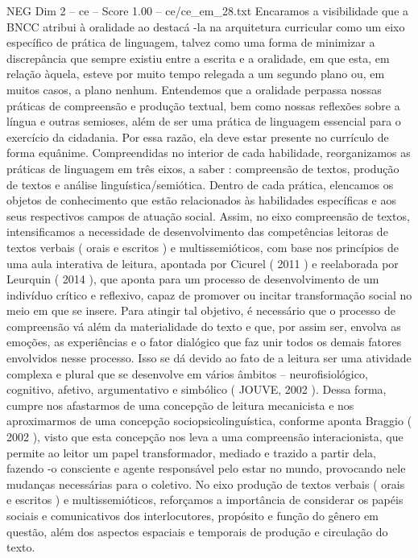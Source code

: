 \begin{textsample}{NEG Dim 2 – ce – Score 1.00 – ce/ce\_em\_28.txt}
Encaramos a visibilidade que a BNCC atribui à oralidade ao destacá -la na arquitetura curricular como um eixo específico de prática de linguagem, talvez como uma forma de minimizar a discrepância que sempre existiu entre a escrita e a oralidade, em que esta, em relação àquela, esteve por muito tempo relegada a um segundo plano ou, em muitos casos, a plano nenhum.
Entendemos que a oralidade perpassa nossas práticas de compreensão e produção textual, bem como nossas reflexões sobre a língua e outras semioses, além de ser uma prática de linguagem essencial para o exercício da cidadania.
Por essa razão, ela deve estar presente no currículo de forma equânime.
Compreendidas no interior de cada habilidade, reorganizamos as práticas de linguagem em três eixos, a saber : compreensão de textos, produção de textos e análise linguística/semiótica.
Dentro de cada prática, elencamos os objetos de conhecimento que estão relacionados às habilidades específicas e aos seus respectivos campos de atuação social.
Assim, no eixo compreensão de textos, intensificamos a necessidade de desenvolvimento das competências leitoras de textos verbais ( orais e escritos ) e multissemióticos, com base nos princípios de uma aula interativa de leitura, apontada por Cicurel ( 2011 ) e reelaborada por Leurquin ( 2014 ), que aponta para um processo de desenvolvimento de um indivíduo crítico e reflexivo, capaz de promover ou incitar transformação social no meio em que se insere.
Para atingir tal objetivo, é necessário que o processo de compreensão vá além da materialidade do texto e que, por assim ser, envolva as emoções, as experiências e o fator dialógico que faz unir todos os demais fatores envolvidos nesse processo.
Isso se dá devido ao fato de a leitura ser uma atividade complexa e plural que se desenvolve em vários âmbitos – neurofisiológico, cognitivo, afetivo, argumentativo e simbólico ( JOUVE, 2002 ).
Dessa forma, cumpre nos afastarmos de uma concepção de leitura mecanicista e nos aproximarmos de uma concepção sociopsicolinguística, conforme aponta Braggio ( 2002 ), visto que esta concepção nos leva a uma compreensão interacionista, que permite ao leitor um papel transformador, mediado e trazido a partir dela, fazendo -o consciente e agente responsável pelo estar no mundo, provocando nele mudanças necessárias para o coletivo.
No eixo produção de textos verbais ( orais e escritos ) e multissemióticos, reforçamos a importância de considerar os papéis sociais e comunicativos dos interlocutores, propósito e função do gênero em questão, além dos aspectos espaciais e temporais de produção e circulação do texto.

\end{textsample}
